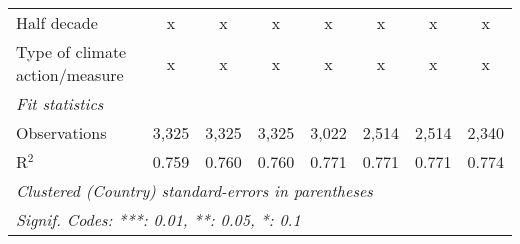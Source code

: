 \begin{tabular}{lccccccc}
   Half decade                                                                          & x            & x            & x            & x             & x            & x            & x\\  
   Type of climate action/measure                                                       & x            & x            & x            & x             & x            & x            & x\\  
   \midrule \emph{Fit statistics}\\
   Observations                                                                         & 3,325        & 3,325        & 3,325        & 3,022         & 2,514        & 2,514        & 2,340\\  
   R$^2$                                                                                & 0.759        & 0.760        & 0.760        & 0.771         & 0.771        & 0.771        & 0.774\\  
   \midrule
   \multicolumn{8}{l}{\emph{Clustered (Country) standard-errors in parentheses}}\\
   \multicolumn{8}{l}{\emph{Signif. Codes: ***: 0.01, **: 0.05, *: 0.1}}\\
\end{tabular}
\par\endgroup


